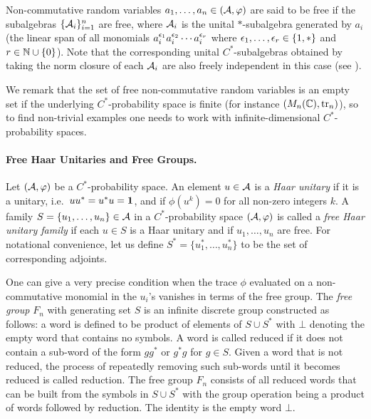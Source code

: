 {Non-commutative random variables $a_1, \ldots, a_n \in (\mathcal A, \varphi)$ are said to be free if the subalgebras $\{\mathcal A_i\}_{i=1}^n$ are free, where $\mathcal A_i$ is the unital $*$-subalgebra  generated by $a_i$ (the linear span of all monomials $a^{\epsilon_1}_ia^{\epsilon_2}_i\cdots a^{\epsilon_r}_i$ where $\epsilon_1, \ldots, \epsilon_r \in \{1,*\}$ and $r \in \mathbb{N} \cup \{0\}$). Note that the corresponding unital $C^*$-subalgebras obtained by taking the norm closure of each $\mathcal A_i$ are also freely independent in this case (see \cite[Exercise 5.23]{NS06}).}



We remark that the set of free non-commutative random variables is an empty set if the underlying $C^*$-probability space is finite (for instance $(M_n(\mathbb{C}), \mathrm{tr}_n)$), so to find non-trivial examples one needs to work with infinite-dimensional $C^*$-probability spaces. 

\paragraph{Free Haar Unitaries and Free Groups.} Let $(\mathcal A, \varphi)$ be a $C^*$-probability space. An element $u \in \mathcal A$ is a \emph{Haar unitary} if it is a unitary, i.e.\ $uu^*=u^*u= \boldsymbol{1}$, and if $\phi(u^k) = 0$ for all non-zero integers $k$. A family $S = \{u_1, \ldots, u_n\} \in \mathcal A$ in a $C^*$-probability space $(\mathcal A, \varphi)$ is called a \emph{free Haar unitary family} if each $u \in S$ is a Haar unitary and if $u_1, \ldots, u_n$ are free. For notational convenience, let us define $S^* = \{u^*_1, \ldots, u^*_n\}$ to be the set of corresponding adjoints.

One can give a very precise condition when the trace $\phi$ evaluated on a non-commutative monomial in the $u_i$'s vanishes in terms of the free group. The \emph{free group} $F_n$ with generating set $S$ is an infinite discrete group constructed as follows: a word is defined to be product of elements of $S \cup S^*$ with $\bot$ denoting the empty word that contains no symbols. A word is called reduced if it does not contain a sub-word of the form $g g^{*}$ or $g^{*} g$ for $g \in S$. Given a word that is not reduced, the process of repeatedly removing such sub-words until it becomes reduced is called reduction. The free group $F_n$ consists of all reduced words that can be built from the symbols in $S \cup S^*$ with the group operation being a product of words followed by reduction. The identity is the empty word $\bot$. 

